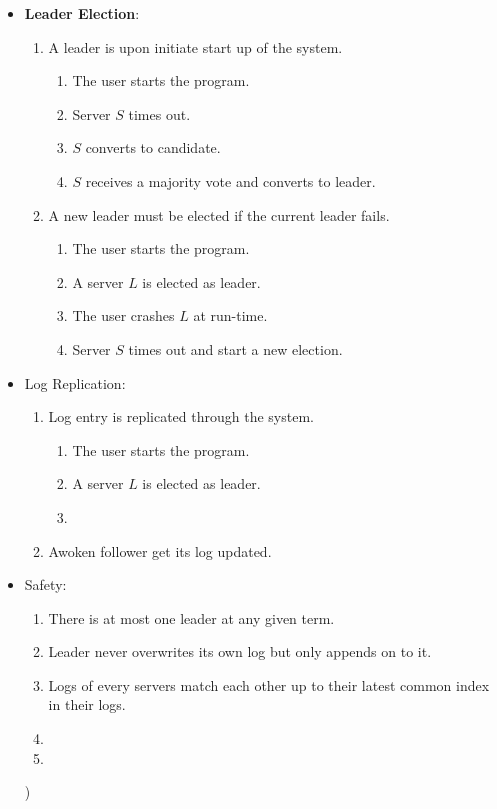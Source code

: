 \begin{itemize}
\item \textbf{Leader Election}:
    \begin{enumerate}
    \item A leader is upon initiate start up of the system.
        \begin{enumerate}
        \item The user starts the program.
        \item Server $S$ times out.
        \item $S$ converts to candidate.
        \item $S$ receives a majority vote and converts to leader.
        \end{enumerate}
    \item A new leader must be elected if the current leader fails.
        \begin{enumerate}
        \item The user starts the program.
        \item A server $L$ is elected as leader.
        \item The user crashes $L$ at run-time.
        \item Server $S$ times out and start a new election.
        \end{enumerate}
    \end{enumerate}
\item Log Replication:
    \begin{enumerate}
    \item Log entry is replicated through the system.
        \begin{enumerate}
        \item The user starts the program.
        \item A server $L$ is elected as leader.
        \item 
        \end{enumerate}
    \item Awoken follower get its log updated.
    \end{enumerate}
\item Safety:
    \begin{enumerate}
    \item There is at most one leader at any given term.
    \item Leader never overwrites its own log but only appends on to it.
    \item Logs of every servers match each other up to their latest common index in their logs.
    \item 
    \item 
    \end{enumerate})
\end{itemize}

